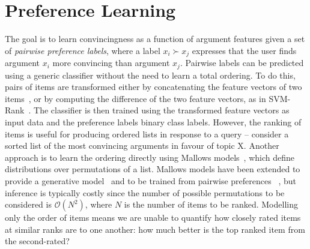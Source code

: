 \section{Preference Learning}\label{sec:pref_learning}

The goal is to learn convincingness as a function of argument features given
a set of \emph{pairwise preference labels}, where a label $x_i \succ x_j$
expresses that the user finds argument $x_i$ more convincing than argument $x_j$.
Pairwise labels can be predicted using a generic classifier without the need to learn a total ordering.
To do this, pairs of items are transformed either by concatenating the feature vectors of two items~\cite{habernal2016argument}, 
or by computing the difference of the two feature vectors, as in SVM-Rank~\cite{joachims2002optimizing}. 
The classifier is then trained using the transformed feature vectors as input data and 
the preference labels binary class labels.
However, the ranking of items is useful for producing ordered lists in response to a query -- 
consider a sorted list of the most convincing arguments in favour of topic X.
Another approach is to learn the ordering directly using Mallows models~\cite{mallows1957non},
which define distributions over permutations of a list. 
Mallows models have been extended to provide a generative model~\cite{qin2010new} and 
to be trained from pairwise preferences %
~\cite{lu2011learning}, but inference is typically costly
since the number of possible permutations to be considered is $\mathcal{O}(N^2)$, 
where $N$ is the number of items to be ranked. 
Modelling only the order of items means we are unable to quantify 
how closely rated items at similar ranks are to one another: how much better is the top ranked item 
from the second-rated?

